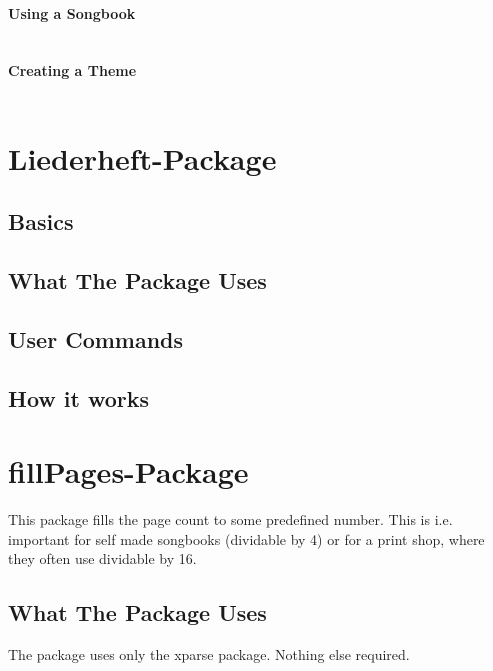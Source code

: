 \documentclass[12pt,a4paper]{scrreprt}
\begin{document}
\subsubsection{Using a Songbook}
\begin{verbatim}

\end{verbatim}



\subsubsection{Creating a Theme}
\begin{verbatim}

\end{verbatim}



\chapter{Liederheft-Package}

\section{Basics}

\section{What The Package Uses}

\section{User Commands}

\section{How it works}






\chapter{fillPages-Package}
This package fills the page count to some predefined number. This is i.e. important for self made songbooks (dividable by 4) or for a print shop, where they often use dividable by 16.

\section{What The Package Uses}
The package uses only the xparse package. Nothing else required.
\end{document}
